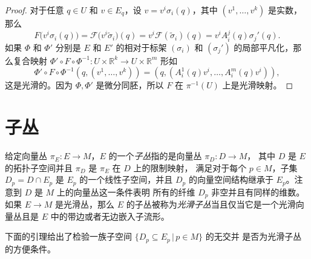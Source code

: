 \begin{proof}
  对于任意 $q\in U$ 和 $v\in E_q$，设 $v=v^i\sigma_i(q)$，其中 $(v^1,\dots,v^k)$
  是实数，那么
  \[
    F\bigl(v^i\sigma_i(q)\bigr)=\mathcal{F}\bigl(v^i\tilde{\sigma}_i\bigr)(q)
    =v^i \mathcal{F}(\tilde{\sigma}_i)(q)=v^iA_i^j(q)\sigma_j'(q).
  \]
  如果 $\varPhi$ 和 $\varPhi'$ 分别是 $E$ 和 $E'$ 的相对于标架 $(\sigma_i)$
  和 $(\sigma_j')$ 的局部平凡化，那么复合映射 $\varPhi'\circ F\circ \varPhi^{-1}:U\times \mathbb{R}^k\to U\times \mathbb{R}^m$
  形如
  \[
    \varPhi'\circ F\circ \varPhi^{-1}\left(
      q,\left(v^1,\dots,v^k\right)
    \right)=
    \left(q,\left(
      A_i^1(q)v^i,\dots,A^m_i(q)v^i
    \right)\right),
  \]
  这是光滑的。因为 $\varPhi,\varPhi'$ 是微分同胚，所以 $F$ 在 $\pi^{-1}(U)$ 上是光滑映射。
\end{proof}



\section{子丛}

给定向量丛 $\pi_E:E\to M$，$E$ 的一个\emph{子丛}指的是向量丛 $\pi_D:D\to M$，
其中 $D$ 是 $E$ 的拓扑子空间并且 $\pi_D$ 是 $\pi_E$ 在 $D$ 上的限制映射，
满足对于每个 $p\in M$，子集 $D_p=D\cap E_p$ 是 $E_p$ 的一个线性子空间，并且
$D_p$ 的向量空间结构继承于 $E_p$。注意到 $D$ 是 $M$ 上的向量丛这一条件表明
所有的纤维 $D_p$ 非空并且有同样的维数。如果 $E\to M$ 是光滑丛，那么
$E$ 的子丛被称为\emph{光滑子丛}当且仅当它是一个光滑向量丛且是 $E$
中的带边或者无边嵌入子流形。

下面的引理给出了检验一族子空间 $\{D_p\subseteq E_p\,|\, p\in M\}$ 的无交并 
是否为光滑子丛的方便条件。


